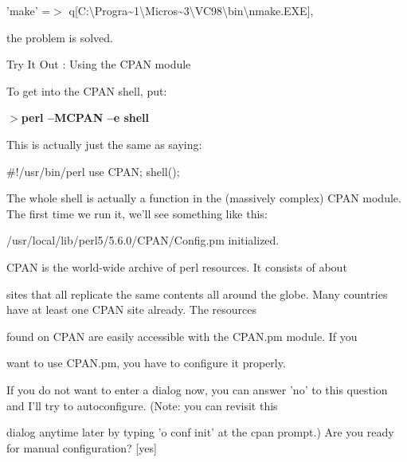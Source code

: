 \documentclass[a4paper,11pt]{book}
\begin{document}
\noindent 

\noindent 'make' =$>$ q[C:\textbackslash Progra\~{}1\textbackslash Micros\~{}3\textbackslash VC98\textbackslash bin\textbackslash nmake.EXE],

\noindent 

\noindent the problem is solved.

\noindent 

\noindent Try It Out : Using the CPAN module

\noindent 

\noindent 

\noindent To get into the CPAN shell, put:

\noindent 

\noindent $>$\textbf{perl --MCPAN --e shell}

\noindent 

\noindent This is actually just the same as saying:

\noindent 

\noindent 

\noindent \#!/usr/bin/perl use CPAN; shell();

\noindent 

\noindent The whole shell is actually a function in the (massively complex) CPAN module. The first time we run it, we'll see something like this:

\noindent 

\noindent /usr/local/lib/perl5/5.6.0/CPAN/Config.pm initialized.

\noindent 

\noindent 

\noindent CPAN is the world-wide archive of perl resources. It consists of about

 sites that all replicate the same contents all around the globe. Many countries have at least one CPAN site already. The resources

\noindent found on CPAN are easily accessible with the CPAN.pm module. If you

\noindent want to use CPAN.pm, you have to configure it properly.

\noindent 

\noindent If you do not want to enter a dialog now, you can answer 'no' to this question and I'll try to autoconfigure. (Note: you can revisit this

\noindent dialog anytime later by typing 'o conf init' at the cpan prompt.) Are you ready for manual configuration? [yes]
\end{document}
